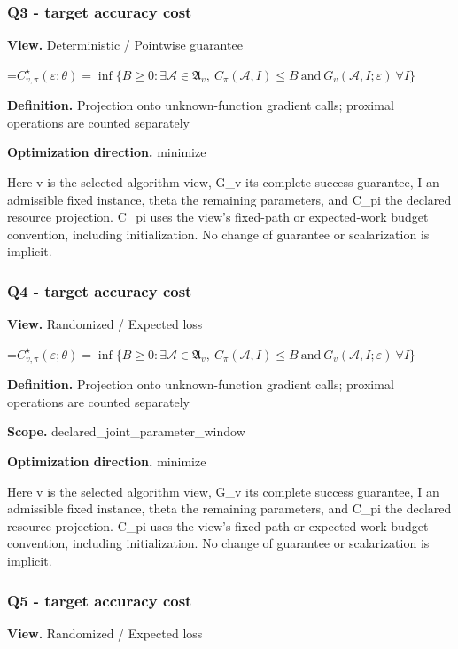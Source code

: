 \documentclass[10pt,a4paper]{article}
\newcommand{\AtlasMath}[1]{\par\begingroup\centering\setbox0=\hbox{$\displaystyle #1$}\ifdim\wd0>1.4\linewidth\typeout{ATLAS WIDE FORMULA: \the\wd0}\fi\ifdim\wd0>\linewidth\resizebox{\linewidth}{!}{\box0}\else\box0\fi\par\endgroup}
\begin{document}
\subsubsection{Q3 - target accuracy cost}
\textbf{View.} Deterministic / Pointwise guarantee

\AtlasMath{C^\star_{v,\pi}(\varepsilon;\theta)=\inf\{B\ge0:\exists\mathcal A\in\mathfrak A_v,\ C_\pi(\mathcal A,I)\le B\ \text{and}\ G_v(\mathcal A,I;\varepsilon)\ \forall I\}}
\textbf{Definition.} Projection onto unknown-function gradient calls; proximal operations are counted separately

\textbf{Optimization direction.} minimize

Here v is the selected algorithm view, G\_v its complete success guarantee, I an admissible fixed instance, theta the remaining parameters, and C\_pi the declared resource projection. C\_pi uses the view's fixed-path or expected-work budget convention, including initialization. No change of guarantee or scalarization is implicit.

\subsubsection{Q4 - target accuracy cost}
\textbf{View.} Randomized / Expected loss

\AtlasMath{C^\star_{v,\pi}(\varepsilon;\theta)=\inf\{B\ge0:\exists\mathcal A\in\mathfrak A_v,\ C_\pi(\mathcal A,I)\le B\ \text{and}\ G_v(\mathcal A,I;\varepsilon)\ \forall I\}}
\textbf{Definition.} Projection onto unknown-function gradient calls; proximal operations are counted separately

\textbf{Scope.} declared\_joint\_parameter\_window

\textbf{Optimization direction.} minimize

Here v is the selected algorithm view, G\_v its complete success guarantee, I an admissible fixed instance, theta the remaining parameters, and C\_pi the declared resource projection. C\_pi uses the view's fixed-path or expected-work budget convention, including initialization. No change of guarantee or scalarization is implicit.

\subsubsection{Q5 - target accuracy cost}
\textbf{View.} Randomized / Expected loss
\end{document}
